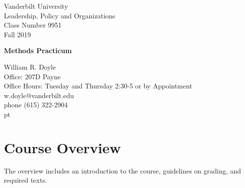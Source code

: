 \documentclass[12pt]{article}
\begin{document}


\thispagestyle{empty}%


\setlength{\parskip}{1ex plus 0.5ex minus 0.2ex}

\setcounter{secnumdepth}{-2}



\begin{flushleft}
Vanderbilt University\\
Leadership, Policy and Organizations\\
Class Number 9951\\ 
Fall 2019\\
\end{flushleft}

\begin{center}
\Large{\textbf{Methods Practicum}}\\
\end{center}

\begin{flushleft}
William R. Doyle\\
Office: 207D Payne\\
Office Hours: Tuesday and Thursday 2:30-5 or by Appointment \\
w.doyle@vanderbilt.edu\\
phone (615) 322-2904\\

 pt

\end{flushleft}

\section{Course Overview}%

The overview includes an introduction to the course, guidelines on grading, and required texts.
\end{document}
